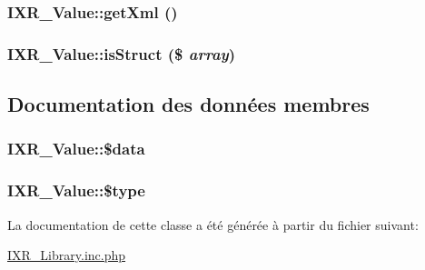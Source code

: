 \hypertarget{classIXR__Value_a2}{
\subsubsection[getXml]{\setlength{\rightskip}{0pt plus 5cm}IXR\_\-Value::get\-Xml ()}}
\label{classIXR__Value_a2}


\hypertarget{classIXR__Value_a3}{
\subsubsection[isStruct]{\setlength{\rightskip}{0pt plus 5cm}IXR\_\-Value::is\-Struct (\$ {\em array})}}
\label{classIXR__Value_a3}




\subsection{Documentation des donn\'{e}es membres}
\hypertarget{classIXR__Value_o0}{
\subsubsection[\$data]{\setlength{\rightskip}{0pt plus 5cm}IXR\_\-Value::\$data}}
\label{classIXR__Value_o0}


\hypertarget{classIXR__Value_o1}{
\subsubsection[\$type]{\setlength{\rightskip}{0pt plus 5cm}IXR\_\-Value::\$type}}
\label{classIXR__Value_o1}




La documentation de cette classe a \'{e}t\'{e} g\'{e}n\'{e}r\'{e}e \`{a} partir du fichier suivant:\begin{CompactItemize}
\item 
\hyperlink{IXR__Library_8inc_8php}{IXR\_\-Library.inc.php}\end{CompactItemize}
